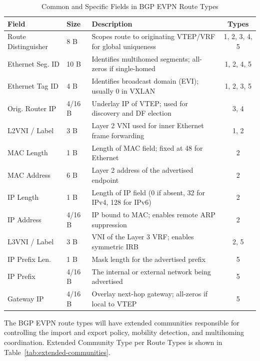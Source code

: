 \begin{table}[!htbp]
\small %
\centering
\begin{tabularx}{\textwidth}{@{}l l X c @{}}
\toprule
\textbf{Field} & \textbf{Size} & \textbf{Description} & \textbf{Types} \\ \midrule
Route Distinguisher & 8 B & Scopes route to originating VTEP/VRF for global uniqueness & 1, 2, 3, 4, 5 \\ \midrule
Ethernet Seg. ID & 10 B & Identifies multihomed segments; all-zeros if single-homed & 1, 2, 4, 5 \\ \midrule
Ethernet Tag ID & 4 B & Identifies broadcast domain (EVI); usually 0 in VXLAN & 1, 2, 3, 5 \\ \midrule
Orig. Router IP & 4/16 B & Underlay IP of VTEP; used for discovery and DF election & 3, 4 \\ \midrule
L2VNI / Label & 3 B & Layer 2 VNI used for inner Ethernet frame forwarding & 1, 2 \\ \midrule
MAC Length & 1 B & Length of MAC field; fixed at 48 for Ethernet & 2 \\ \midrule
MAC Address & 6 B & Layer 2 address of the advertised endpoint & 2 \\ \midrule
IP Length & 1 B & Length of IP field (0 if absent, 32 for IPv4, 128 for IPv6) & 2 \\ \midrule
IP Address & 4/16 B & IP bound to MAC; enables remote ARP suppression & 2 \\ \midrule
L3VNI / Label & 3 B & VNI of the Layer 3 VRF; enables symmetric IRB & 2, 5 \\ \midrule
IP Prefix Len. & 1 B & Mask length for the advertised prefix & 5 \\ \midrule
IP Prefix & 4/16 B & The internal or external network being advertised & 5 \\ \midrule
Gateway IP & 4/16 B & Overlay next-hop gateway; all-zeros if local to VTEP & 5 \\ \bottomrule
\end{tabularx}
\caption{Common and Specific Fields in BGP EVPN Route Types}
\label{tab:evpn-route-fields}
\end{table}

The BGP EVPN route types will have extended communities responsible for controlling the import and export policy, mobility detection, and multihoming coordination. Extended Community Type per Route Types is shown in Table~\ref{tab:extended-communities}.

